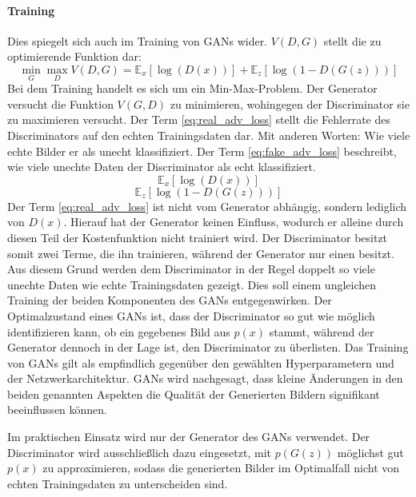 \paragraph{Training}
Dies spiegelt sich auch im Training von \acp{GAN} wider. $V(D,G)$ stellt die zu optimierende Funktion dar: \cite{Goodfellow-GANs}
\begin{equation}
   \label{eq:adv_loss}
	\min_{G} \max_{D} V(D,G) = \mathbb{E}_{x}[\log(D(x))] + \mathbb{E}_{z}[\log(1-D(G(z)))]
\end{equation}
Bei dem Training handelt es sich um ein Min-Max-Problem. Der Generator versucht die Funktion $V(G,D)$ zu minimieren, wohingegen der Discriminator sie zu maximieren versucht. Der Term \ref{eq:real_adv_loss} stellt die Fehlerrate des Discriminators auf den echten Trainingsdaten dar. Mit anderen Worten: Wie viele echte Bilder er als unecht klassifiziert. Der Term \ref{eq:fake_adv_loss} beschreibt, wie viele unechte Daten der Discriminator als echt klassifiziert. \cite{visualApproach}
\begin{equation}
   \label{eq:real_adv_loss}
	\mathbb{E}_{x}[\log(D(x))]
\end{equation}
\begin{equation}
   \label{eq:fake_adv_loss}
	\mathbb{E}_{z}[\log(1-D(G(z)))]
\end{equation}
Der Term \ref{eq:real_adv_loss} ist nicht vom Generator abhängig, sondern lediglich von $D(x)$. Hierauf hat der Generator keinen Einfluss, wodurch er alleine durch diesen Teil der Kostenfunktion nicht trainiert wird. Der Discriminator besitzt somit zwei Terme, die ihn trainieren, während der Generator nur einen besitzt. Aus diesem Grund werden dem Discriminator in der Regel doppelt so viele unechte Daten wie echte Trainingsdaten gezeigt. Dies soll einem ungleichen Training der beiden Komponenten des \acp{GAN} entgegenwirken. Der Optimalzustand eines \acp{GAN} ist, dass der Discriminator so gut wie möglich identifizieren kann, ob ein gegebenes Bild aus $p(x)$ stammt, während der Generator dennoch in der Lage ist, den Discriminator zu überlisten. Das Training von \acp{GAN} gilt als empfindlich gegenüber den gewählten Hyperparametern und der Netzwerkarchitektur. \acp{GAN} wird nachgesagt, dass kleine Änderungen in den beiden genannten Aspekten die Qualität der Generierten Bildern signifikant beeinflussen können. \cite{visualApproach}

Im praktischen Einsatz wird nur der Generator des \acp{GAN} verwendet. Der Discriminator wird ausschließlich dazu eingesetzt, mit $p(G(z))$ möglichst gut $p(x)$ zu approximieren, sodass die generierten Bilder im Optimalfall nicht von echten Trainingsdaten zu unterscheiden sind. \cite{visualApproach}

